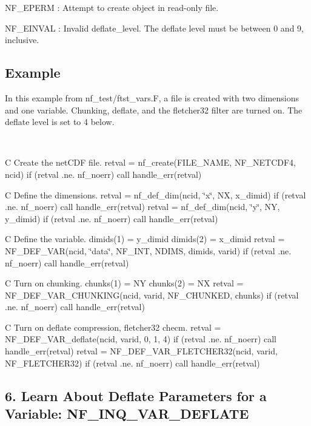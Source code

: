 {\ttfamily N\+F\+\_\+\+E\+P\+E\+RM} \+: Attempt to create object in read-\/only file.

{\ttfamily N\+F\+\_\+\+E\+I\+N\+V\+AL} \+: Invalid deflate\+\_\+level. The deflate level must be between 0 and 9, inclusive.

\subsection*{Example }

In this example from nf\+\_\+test/ftst\+\_\+vars.\+F, a file is created with two dimensions and one variable. Chunking, deflate, and the fletcher32 filter are turned on. The deflate level is set to 4 below.

 

C Create the net\+C\+DF file. retval = nf\+\_\+create(\+F\+I\+L\+E\+\_\+\+N\+A\+M\+E, N\+F\+\_\+\+N\+E\+T\+C\+D\+F4, ncid) if (retval .ne. nf\+\_\+noerr) call handle\+\_\+err(retval)

C Define the dimensions. retval = nf\+\_\+def\+\_\+dim(ncid, \char`\"{}x\char`\"{}, NX, x\+\_\+dimid) if (retval .ne. nf\+\_\+noerr) call handle\+\_\+err(retval) retval = nf\+\_\+def\+\_\+dim(ncid, \char`\"{}y\char`\"{}, NY, y\+\_\+dimid) if (retval .ne. nf\+\_\+noerr) call handle\+\_\+err(retval)

C Define the variable. dimids(1) = y\+\_\+dimid dimids(2) = x\+\_\+dimid retval = N\+F\+\_\+\+D\+E\+F\+\_\+\+V\+AR(ncid, \char`\"{}data\char`\"{}, N\+F\+\_\+\+I\+NT, N\+D\+I\+MS, dimids, varid) if (retval .ne. nf\+\_\+noerr) call handle\+\_\+err(retval)

C Turn on chunking. chunks(1) = NY chunks(2) = NX retval = N\+F\+\_\+\+D\+E\+F\+\_\+\+V\+A\+R\+\_\+\+C\+H\+U\+N\+K\+I\+N\+G(ncid, varid, N\+F\+\_\+\+C\+H\+U\+N\+K\+E\+D, chunks) if (retval .ne. nf\+\_\+noerr) call handle\+\_\+err(retval)

C Turn on deflate compression, fletcher32 checm. retval = N\+F\+\_\+\+D\+E\+F\+\_\+\+V\+A\+R\+\_\+deflate(ncid, varid, 0, 1, 4) if (retval .ne. nf\+\_\+noerr) call handle\+\_\+err(retval) retval = N\+F\+\_\+\+D\+E\+F\+\_\+\+V\+A\+R\+\_\+\+F\+L\+E\+T\+C\+H\+E\+R32(ncid, varid, N\+F\+\_\+\+F\+L\+E\+T\+C\+H\+E\+R32) if (retval .ne. nf\+\_\+noerr) call handle\+\_\+err(retval)

\subsection*{6. Learn About Deflate Parameters for a Variable\+: {\ttfamily N\+F\+\_\+\+I\+N\+Q\+\_\+\+V\+A\+R\+\_\+\+D\+E\+F\+L\+A\+TE} }

